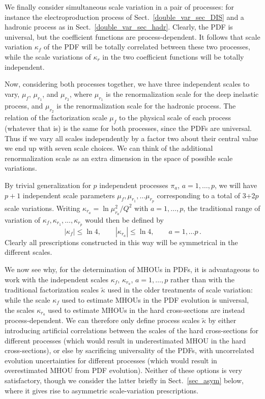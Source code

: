 We finally consider simultaneous scale variation in a pair of
processes: for instance the electroproduction
process of Sect.~\ref{double_var_sec_DIS} and a hadronic
process as in Sect.~\ref{double_var_sec_hadr}.
%
Clearly, the
PDF is universal, but the coefficient functions are
process-dependent.
%
It follows that scale variation $\kappa_f$ of the
PDF will be totally correlated between these two processes,
while the scale variations of 
$\kappa_r$ in the two coefficient functions will be totally independent.  


Now, considering both processes together, we have three
independent scales to vary, $\mu_f$, $\mu_{r_1}$, and $\mu_{r_2}$, where
$\mu_{r_1}$ is the renormalization scale for the deep inelastic process,
and $\mu_{r_2}$ is the renormalization scale for the hadronic process. The
relation of the
factorization scale $\mu_f$ to the physical scale of each process
(whatever that is) is the same for both processes, since the PDFs
are universal.
%
Thus if we vary all scales independently
by a factor two about their central value we end up with seven
scale choices.
%
We can think of the additional renormalization scale as an
extra dimension in the space of possible scale variations.

By trivial
generalization for $p$ independent processes $\pi_a$, $a=1,\ldots,p$,
we will have $p+1$ independent scale parameters
$\mu_f,\mu_{r_1},\ldots\mu_{r_p}$ corresponding to a total of 3+2$p$ scale variations.
%
Writing
$\kappa_{r_a} = \ln \mu_{r_a}^2/Q^2$ with $a= 1,\ldots,p$, the traditional range
of variation of $\kappa_f, \kappa_{r_1}, ..., \kappa_{r_p}$ would then be  defined by
\[
|\kappa_f| \leq \ln 4,\qquad |\kappa_{r_a}| \leq \ln 4,\qquad a=1,\ldots p \, .\label{eq:range}
\] 
Clearly all prescriptions constructed in this way will be symmetrical
in the different scales. 

We now see why, for the determination of MHOUs in PDFs, it is advantageous 
to work with 
the independent scales $\kappa_f$, $\kappa_{r_a}$, $a = 1,\ldots,p$ rather
than with  the traditional factorization scales $\tilde\kappa$ used in the
older treatments of scale variation: while the scale $\kappa_f$ used
to estimate MHOUs in the PDF evolution is universal, the scales
$\kappa_{r_a}$ used to estimate MHOUs in the hard cross-sections are instead
process-dependent.
%
We can therefore only define process scales $\tilde\kappa$ by
either introducing artificial correlations between the scales of the
hard cross-sections for different processes (which would result in
underestimated MHOU in the hard cross-sections), or else by sacrificing
universality of the PDFs, with uncorrelated evolution uncertainties
for different processes (which would result in overestimated MHOU from
PDF evolution). Neither of these options is very satisfactory, though
we consider the latter briefly in Sect.~\ref{sec_asym}
below, where it gives rise
to asymmetric scale-variation prescriptions. 

